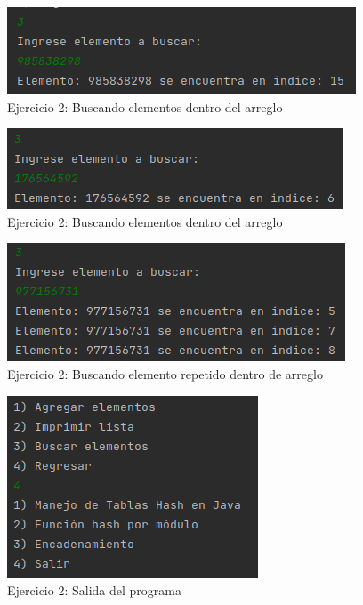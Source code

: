 \documentclass{article}
\begin{document}
			\begin{figure}[H]
				\centering
				\includegraphics{images/e214.png}
				\caption*{Ejercicio 2: Buscando elementos dentro del arreglo}
			\end{figure}
			
			\begin{figure}[H]
				\centering
				\includegraphics{images/e215.png}
				\caption*{Ejercicio 2: Buscando elementos dentro del arreglo}
			\end{figure}
			
			\begin{figure}[H]
				\centering
				\includegraphics{images/e216.png}
				\caption*{Ejercicio 2: Buscando elemento repetido dentro de arreglo}
			\end{figure}
			
			\begin{figure}[H]
				\centering
				\includegraphics{images/e217.png}
				\caption*{Ejercicio 2: Salida del programa}
			\end{figure}
			
\end{document}
